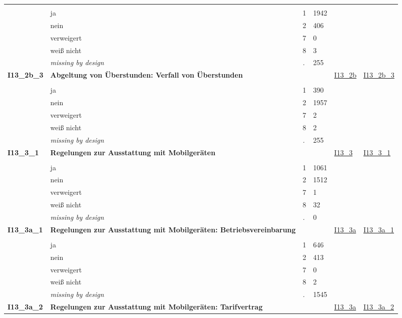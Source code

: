 \begin{longtable}{| L{2.45cm} | L{6cm} | C{1.5cm} | R{1cm} | C{2.25cm} | C{2.25cm} |}
   &  &  &  &  &  \\ 
   & ja & 1 & 1942 &  &  \\ 
   & nein & 2 & 406 &  &  \\ 
   & verweigert & 7 & 0 &  &  \\ 
   & weiß nicht & 8 & 3 &  &  \\ 
   & \textit{missing by design} & \textit{.} & 255 &  &  \\ 
   \midrule
\textbf{I13\_2b\_3}\label{var:I13:2b:3} & \textbf{Abgeltung von Überstunden: Verfall von Überstunden} &  &  & \hyperref[I13:2b]{I13\_2b} & \hyperref[var:suf:I13:2b:3]{I13\_2b\_3} \\ 
   &  &  &  &  &  \\ 
   & ja & 1 & 390 &  &  \\ 
   & nein & 2 & 1957 &  &  \\ 
   & verweigert & 7 & 2 &  &  \\ 
   & weiß nicht & 8 & 2 &  &  \\ 
   & \textit{missing by design} & \textit{.} & 255 &  &  \\ 
   \midrule
\textbf{I13\_3\_1}\label{var:I13:3:1} & \textbf{Regelungen zur Ausstattung mit Mobilgeräten} &  &  & \hyperref[I13:3]{I13\_3} & \hyperref[var:suf:I13:3:1]{I13\_3\_1} \\ 
   &  &  &  &  &  \\ 
   & ja & 1 & 1061 &  &  \\ 
   & nein & 2 & 1512 &  &  \\ 
   & verweigert & 7 & 1 &  &  \\ 
   & weiß nicht & 8 & 32 &  &  \\ 
   & \textit{missing by design} & \textit{.} & 0 &  &  \\ 
   \midrule
\textbf{I13\_3a\_1}\label{var:I13:3a:1} & \textbf{Regelungen zur Ausstattung mit Mobilgeräten: Betriebsvereinbarung} &  &  & \hyperref[I13:3a]{I13\_3a} & \hyperref[var:suf:I13:3a:1]{I13\_3a\_1} \\ 
   &  &  &  &  &  \\ 
   & ja & 1 & 646 &  &  \\ 
   & nein & 2 & 413 &  &  \\ 
   & verweigert & 7 & 0 &  &  \\ 
   & weiß nicht & 8 & 2 &  &  \\ 
   & \textit{missing by design} & \textit{.} & 1545 &  &  \\ 
   \midrule
\textbf{I13\_3a\_2}\label{var:I13:3a:2} & \textbf{Regelungen zur Ausstattung mit Mobilgeräten: Tarifvertrag} &  &  & \hyperref[I13:3a]{I13\_3a} & \hyperref[var:suf:I13:3a:2]{I13\_3a\_2} \\ 

\end{longtable}
